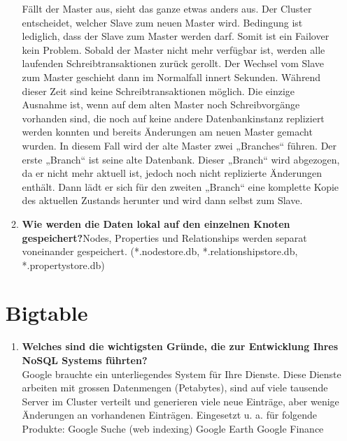 \documentclass[a4paper,10pt,titlepage=false]{scrreprt}
\begin{document}
\begin{itemize}
\begin{enumerate}
Fällt der Master aus, sieht das ganze etwas anders aus. Der Cluster entscheidet, welcher Slave zum neuen Master wird. Bedingung ist lediglich, dass der Slave zum Master werden darf. Somit ist ein Failover kein Problem. Sobald der Master nicht mehr verfügbar ist, werden alle laufenden Schreibtransaktionen zurück gerollt. Der Wechsel vom Slave zum Master geschieht dann im Normalfall innert Sekunden. Während dieser Zeit sind keine Schreibtransaktionen möglich.
Die einzige Ausnahme ist, wenn auf dem alten Master noch Schreibvorgänge vorhanden sind, die noch auf keine andere Datenbankinstanz repliziert werden konnten und bereits Änderungen am neuen Master gemacht wurden. In diesem Fall wird der alte Master zwei „Branches“ führen. Der erste „Branch“ ist seine alte Datenbank. Dieser „Branch“ wird abgezogen, da er nicht mehr aktuell ist, jedoch noch nicht replizierte Änderungen enthält. Dann lädt er sich für den zweiten „Branch“ eine komplette Kopie des aktuellen Zustands herunter und wird dann selbst zum Slave.
\item \textbf{Wie werden die Daten lokal auf den einzelnen Knoten gespeichert?}Nodes, Properties und Relationships werden separat voneinander gespeichert. (*.nodestore.db, *.relationshipstore.db, *.propertystore.db)
\end{enumerate}
\section{Bigtable} %
\label{sec:bigtable}
\begin{enumerate}
  \item \textbf{Welches sind die wichtigsten Gründe, die zur Entwicklung Ihres NoSQL Systems führten?}\\
  Google brauchte ein unterliegendes System für Ihre Dienste. Diese Dienste arbeiten mit grossen Datenmengen (Petabytes), sind auf viele tausende Server im Cluster verteilt und generieren viele neue Einträge, aber wenige Änderungen an vorhandenen Einträgen. 
Eingesetzt u. a. für folgende Produkte: Google Suche (web indexing)
Google Earth
Google Finance\\


\end{enumerate}
\end{itemize}
\end{document}
